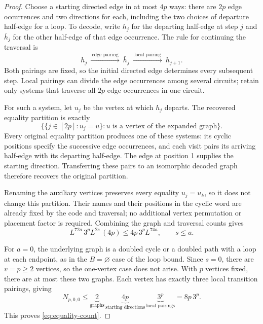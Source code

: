 \documentclass[11pt]{article}
\theoremstyle{definition}
\theoremstyle{remark}
\theoremstyle{plain}
\begin{document}
\begin{proof}
Choose a starting directed edge in at most
\(4p\) ways: there are $2p$ edge occurrences and two directions
for each, including the two choices of departure half-edge for a
loop. To decode, write $h_j$ for the departing half-edge at step $j$
and $\bar h_j$ for the other half-edge of that edge occurrence.
The rule for continuing the traversal is
\[
 h_j\ \xrightarrow{\ \text{edge pairing}\ }\ \bar h_j
     \ \xrightarrow{\ \text{local pairing}\ }\ h_{j+1}.
\]
Both pairings are fixed, so the initial directed edge determines
every subsequent step. Local pairings can divide the edge occurrences
among several circuits; retain only systems that traverse all $2p$
edge occurrences in one circuit.

For such a system, let $u_j$ be the vertex at which $h_j$ departs.
The recovered equality partition is exactly
\[
 \bigl\{\{j\in[2p]:u_j=u\}:u\text{ is a vertex of the expanded graph}\bigr\}.
\]
Every original equality partition produces one of these systems:
its cyclic positions specify the successive edge occurrences, and
each visit pairs its arriving half-edge with its departing half-edge.
The edge at position 1 supplies the starting direction. Transferring
these pairs to an isomorphic decoded graph therefore recovers the
original partition.

Renaming the auxiliary vertices preserves every equality $u_j=u_k$,
so it does not change this partition. Their names and their positions
in the cyclic word are already fixed by the code and traversal; no
additional vertex permutation or placement factor is required.
Combining the graph and traversal counts gives
\[
 L^{72a}\,3^pL^{2s}\,(4p)
 \le4p\,3^pL^{74a},\qquad s\le a.
\]

For \(a=0\), the underlying graph is a doubled cycle or a doubled
path with a loop at each endpoint, as in the $B=\varnothing$
case of the loop bound. Since $s=0$, there are $v=p\ge2$ vertices,
so the one-vertex case does not arise. With $p$ vertices fixed,
there are at most these two graphs. Each vertex has exactly three
local transition pairings, giving
\[
 N_{p,0,0}\le
 \underbrace{2}_{\text{graphs}}\,
 \underbrace{4p}_{\text{starting directions}}\,
 \underbrace{3^p}_{\text{local pairings}}
 =8p\,3^p.
\]
This proves \eqref{eq:equality-count}.
\end{proof}
\end{document}
